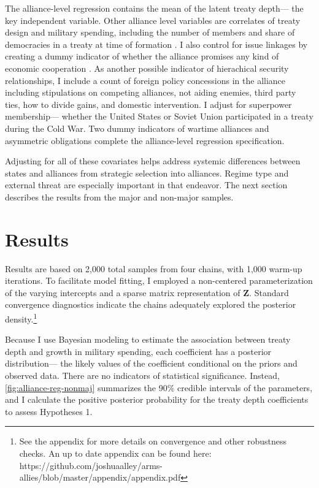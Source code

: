 \documentclass[12pt]{article}
\begin{document}
The alliance-level regression contains the mean of the latent treaty depth--- the key independent variable. 
Other alliance level variables are correlates of treaty design and military spending, including the number of members and share of democracies in a treaty at time of formation \citep{Chibaetal2015}. 
I also control for issue linkages by creating a dummy indicator of whether the alliance promises any kind of economic cooperation \citep{Poast2013, LongLeeds2006}. 
As another possible indicator of hierachical security relationships, I include a count of foreign policy concessions in the alliance including stipulations on competing alliances, not aiding enemies, third party ties, how to divide gains, and domestic intervention. 
I adjust for superpower membership--- whether the United States or Soviet Union participated in a treaty during the Cold War. 
Two dummy indicators of wartime alliances and asymmetric obligations \citep{Leedsetal2002} complete the alliance-level regression specification. 


Adjusting for all of these covariates helps address systemic differences between states and alliances from strategic selection into alliances. 
Regime type and external threat are especially important in that endeavor. 
The next section describes the results from the major and non-major samples.
 

\section{Results}


Results are based on 2,000 total samples from four chains, with 1,000 warm-up iterations. 
To facilitate model fitting, I employed a non-centered parameterization of the varying intercepts and a sparse matrix representation of \textbf{Z}. 
Standard convergence diagnostics indicate the chains adequately explored the posterior density.\footnote{See the appendix for more details on convergence and other robustness checks. An up to date appendix can be found here: https://github.com/joshuaalley/arms-allies/blob/master/appendix/appendix.pdf} 


Because I use Bayesian modeling to estimate the association between treaty depth and growth in military spending, each coefficient has a posterior distribution--- the likely values of the coefficient conditional on the priors and observed data.
There are no indicators of statistical significance. 
Instead, \autoref{fig:alliance-reg-nonmaj} summarizes the 90\% credible intervals of the parameters, and I calculate the positive posterior probability for the treaty depth coefficients to assess Hypotheses 1.
\end{document}
